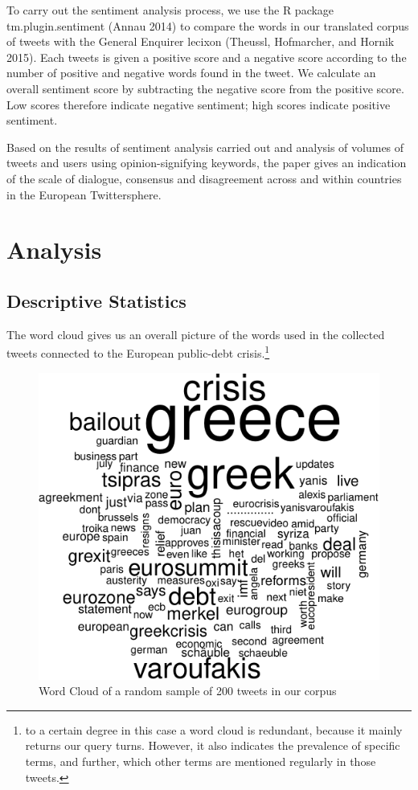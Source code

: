 \documentclass[]{article}
\let\rmarkdownfootnote\footnote%
\def\footnote{\protect\rmarkdownfootnote}
\begin{document}
To carry out the sentiment analysis process, we use the R package
tm.plugin.sentiment (Annau 2014) to compare the words in our translated
corpus of tweets with the General Enquirer lecixon (Theussl, Hofmarcher,
and Hornik 2015). Each tweets is given a positive score and a negative
score according to the number of positive and negative words found in
the tweet. We calculate an overall sentiment score by subtracting the
negative score from the positive score. Low scores therefore indicate
negative sentiment; high scores indicate positive sentiment.

Based on the results of sentiment analysis carried out and analysis of
volumes of tweets and users using opinion-signifying keywords, the paper
gives an indication of the scale of dialogue, consensus and disagreement
across and within countries in the European Twittersphere.

\section{Analysis}\label{analysis}

\subsection{Descriptive Statistics}\label{descriptive-statistics}

The word cloud gives us an overall picture of the words used in the
collected tweets connected to the European public-debt crisis.\footnote{to
  a certain degree in this case a word cloud is redundant, because it
  mainly returns our query turns. However, it also indicates the
  prevalence of specific terms, and further, which other terms are
  mentioned regularly in those tweets.}

\begin{figure}[htbp]
\centering
\includegraphics{fin_paper_files/figure-latex/unnamed-chunk-2-1.pdf}
\caption{Word Cloud of a random sample of 200 tweets in our corpus}
\end{figure}
\end{document}
